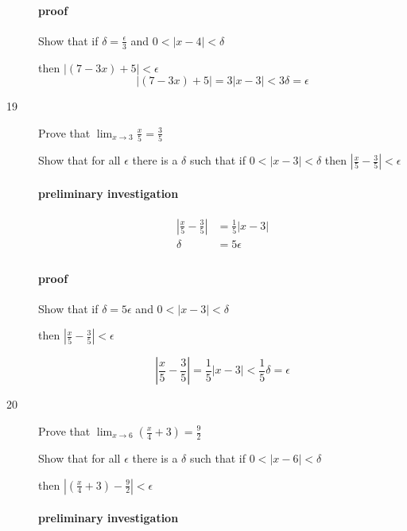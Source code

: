 \documentclass[letterpaper, landscape]{exam}
\begin{document}
\begin{description}
        \paragraph{proof}
        Show that if $\delta = \frac{\epsilon}{3}$ and $0 < |x - 4| < \delta$

        then $|(7 - 3x) + 5| < \epsilon$
        \[
          |(7 - 3x) + 5| = 3 |x - 3| < 3 \delta = \epsilon
        \]

      \newpage

      \item[19] Prove that $\lim_{x \to 3} \frac{x}{5} = \frac{3}{5}$

        Show that for all $\epsilon$ there is a $\delta$ such that if 
        $0 < |x - 3| < \delta$ then $ \left| \frac{x}{5} - \frac{3}{5} \right| < \epsilon$

        \paragraph{preliminary investigation}
        \begin{align*}
          \left| \frac{x}{5} - \frac{3}{5} \right| & = \frac{1}{5} |x - 3| \\
          \delta                                   & = 5 \epsilon \\
        \end{align*}

        \paragraph{proof}
        Show that if $\delta = 5 \epsilon$ and $0 < |x - 3| < \delta$

        then $\left| \frac{x}{5} - \frac{3}{5} \right| < \epsilon$

        \[
          \left| \frac{x}{5} - \frac{3}{5} \right| 
            = \frac{1}{5} |x - 3| < \frac{1}{5} \delta = \epsilon
        \]

      \item[20] Prove that $\lim_{x \to 6} \left( \frac{x}{4} + 3 \right) = \frac{9}{2}$

        Show that for all $\epsilon$ there is a $\delta$ such that if 
        $0 < |x - 6| < \delta$ 
        
        then $ \left| \left( \frac{x}{4} + 3 \right) - \frac{9}{2} \right| < \epsilon$

        \paragraph{preliminary investigation}


\end{description}
\end{document}
